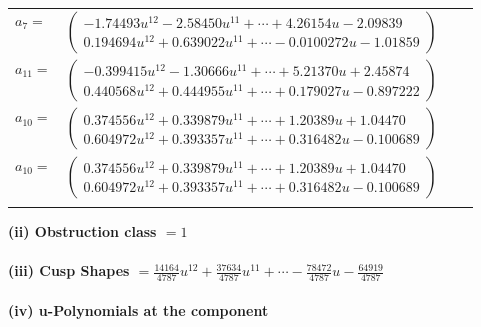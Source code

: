 \documentclass[1p]{elsarticle_modified}
\theoremstyle{definition}
\begin{document}
\begin{tabular}{m{7pt} m{180pt} m{7pt} m{180pt} }
\flushright $a_{7}=$&$\begin{pmatrix}-1.74493 u^{12}-2.58450 u^{11}+\cdots+4.26154 u-2.09839\\0.194694 u^{12}+0.639022 u^{11}+\cdots-0.0100272 u-1.01859\end{pmatrix}$ \\
\flushright $a_{11}=$&$\begin{pmatrix}-0.399415 u^{12}-1.30666 u^{11}+\cdots+5.21370 u+2.45874\\0.440568 u^{12}+0.444955 u^{11}+\cdots+0.179027 u-0.897222\end{pmatrix}$ \\
\flushright $a_{10}=$&$\begin{pmatrix}0.374556 u^{12}+0.339879 u^{11}+\cdots+1.20389 u+1.04470\\0.604972 u^{12}+0.393357 u^{11}+\cdots+0.316482 u-0.100689\end{pmatrix}$\\ \flushright $a_{10}=$&$\begin{pmatrix}0.374556 u^{12}+0.339879 u^{11}+\cdots+1.20389 u+1.04470\\0.604972 u^{12}+0.393357 u^{11}+\cdots+0.316482 u-0.100689\end{pmatrix}$\\&\end{tabular}
\flushleft \textbf{(ii) Obstruction class $= 1$}\\~\\
\flushleft \textbf{(iii) Cusp Shapes $= \frac{14164}{4787} u^{12}+\frac{37634}{4787} u^{11}+\cdots-\frac{78472}{4787} u-\frac{64919}{4787}$}\\~\\
\newpage\renewcommand{\arraystretch}{1}
\flushleft \textbf{(iv) u-Polynomials at the component}\newline \\
\end{document}
